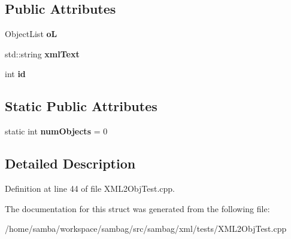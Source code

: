 \subsection*{Public Attributes}
\begin{DoxyCompactItemize}
\item 
\hypertarget{struct_base_object_aaeb58511262f4868b73198c20199d4b9}{
ObjectList {\bfseries oL}}
\label{struct_base_object_aaeb58511262f4868b73198c20199d4b9}

\item 
\hypertarget{struct_base_object_a00f7f647ca9a0583d2b11fc9fb278540}{
std::string {\bfseries xmlText}}
\label{struct_base_object_a00f7f647ca9a0583d2b11fc9fb278540}

\item 
\hypertarget{struct_base_object_ab21889ef86ffc1849898d2613ccdc75f}{
int {\bfseries id}}
\label{struct_base_object_ab21889ef86ffc1849898d2613ccdc75f}

\end{DoxyCompactItemize}
\subsection*{Static Public Attributes}
\begin{DoxyCompactItemize}
\item 
\hypertarget{struct_base_object_a82e3c8af21d913af997dda53a2e9c0af}{
static int {\bfseries numObjects} = 0}
\label{struct_base_object_a82e3c8af21d913af997dda53a2e9c0af}

\end{DoxyCompactItemize}


\subsection{Detailed Description}


Definition at line 44 of file XML2ObjTest.cpp.



The documentation for this struct was generated from the following file:\begin{DoxyCompactItemize}
\item 
/home/samba/workspace/sambag/src/sambag/xml/tests/XML2ObjTest.cpp\end{DoxyCompactItemize}
